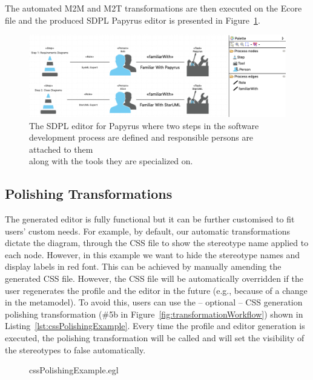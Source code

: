 The automated M2M and M2T transformations are then executed on the Ecore file and the produced SDPL Papyrus editor is presented in Figure~\ref{fig:sdplEditor}. 

\begin{figure}[ht!]
	\centering
	\includegraphics[width=1\textwidth]{images/sdplEditor.png}
	\caption[]{The SDPL editor for Papyrus where two steps in the software 
		development process are defined and responsible persons are attached to 
		them\\ along with the tools they are specialized on.}
	\label{fig:sdplEditor}
\end{figure}

\subsection{Polishing Transformations}
The generated editor is fully functional but it can be further customised to fit users' custom needs. 
For example, by default, our automatic transformations dictate the diagram, through the CSS file to show the stereotype name applied to each node. 
However, in this example we want to hide the stereotype names and display labels in red font. 
This can be achieved by manually amending the generated CSS file. 
However, the CSS file will be automatically overridden if the user regenerates the profile and the editor in the future (e.g., because of a change in the metamodel). 
To avoid this, users can use the -- optional -- CSS generation polishing transformation (\#5b in Figure~\ref{fig:transformationWorkflow}) shown in Listing~\ref{lst:cssPolishingExample}. 
Every time the profile and editor generation is executed, the polishing transformation will be called and will set the visibility of the stereotypes to false automatically. 

\begin{figure}
	
	{cssPolishingExample.egl}
\end{figure}

